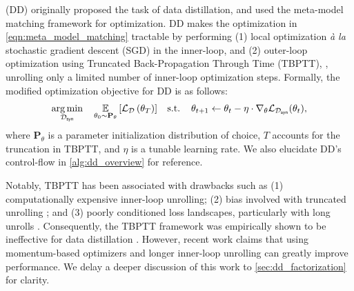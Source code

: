 \documentclass[10pt]{article} %
\begin{document}
\citet{dd_orig} (DD) originally proposed the task of data distillation, and used the meta-model matching framework for optimization. DD makes
the optimization in \cref{eqn:meta_model_matching} tractable by performing (1) local optimization \emph{\`a la} stochastic gradient descent (SGD) in the inner-loop, and (2) outer-loop optimization using Truncated Back-Propagation Through Time (TBPTT), \ie, unrolling only a limited number of inner-loop optimization steps. Formally, the modified optimization objective for DD is as follows:
\begin{equation} \label{eqn:dd_orig_optimization}
\begin{gathered}
    \underset{\mathcal{D}_{\mathsf{syn}}}{\operatorname{arg} \operatorname{min}} \hspace{0.4cm} \underset{\theta_0 \sim \mathbf{P}_\theta}{\mathbb{E}} \left[\mathcal{L}_{\mathcal{D}}\left(\theta_T\right)\right] \hspace{0.3cm}
    \text{s.t.} \hspace{0.4cm} \theta_{t+1} \leftarrow \theta_t - \eta \cdot \nabla_\theta \mathcal{L}_{\mathcal{D}_{\mathsf{syn}}}(\theta_t),
\end{gathered}
\end{equation}
where $\mathbf{P}_\theta$ is a parameter initialization distribution of choice, $T$ accounts for the truncation in TBPTT, and $\eta$ is a tunable learning rate. We also elucidate DD's control-flow in \cref{alg:dd_overview} for reference. 

Notably, TBPTT has been associated with drawbacks such as (1) computationally expensive inner-loop unrolling; (2) bias involved with truncated unrolling \citep{biased_bptt}; and (3) poorly conditioned loss landscapes, particularly with long unrolls \citep{bptt_loss_landscape}. Consequently, the TBPTT framework was empirically shown to be ineffective for data distillation \citep{zhao_dc}. However, recent work \citep{remember_past} claims that using momentum-based optimizers and longer inner-loop unrolling can greatly improve performance. We delay a deeper discussion of this work to \cref{sec:dd_factorization} for clarity.
\end{document}
